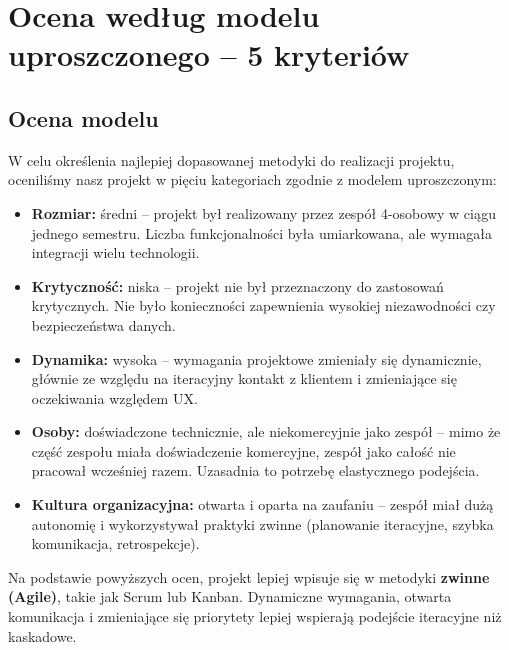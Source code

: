 \documentclass[12pt,a4paper,colorlinks=true,linkcolor=NavyBlue,citecolor=red,urlcolor=NavyBlue]{book}
\begin{document}

\chapter{Ocena według modelu uproszczonego – 5 kryteriów}

\section{Ocena modelu}

W celu określenia najlepiej dopasowanej metodyki do realizacji projektu, oceniliśmy nasz projekt w pięciu kategoriach zgodnie z modelem uproszczonym:

\begin{itemize}
  \item \textbf{Rozmiar:} średni – projekt był realizowany przez zespół 4-osobowy w ciągu jednego semestru. Liczba funkcjonalności była umiarkowana, ale wymagała integracji wielu technologii.
  
  \item \textbf{Krytyczność:} niska – projekt nie był przeznaczony do zastosowań krytycznych. Nie było konieczności zapewnienia wysokiej niezawodności czy bezpieczeństwa danych.
  
  \item \textbf{Dynamika:} wysoka – wymagania projektowe zmieniały się dynamicznie, głównie ze względu na iteracyjny kontakt z klientem i zmieniające się oczekiwania względem UX.
  
  \item \textbf{Osoby:} doświadczone technicznie, ale niekomercyjnie jako zespół – mimo że część zespołu miała doświadczenie komercyjne, zespół jako całość nie pracował wcześniej razem. Uzasadnia to potrzebę elastycznego podejścia.
  
  \item \textbf{Kultura organizacyjna:} otwarta i oparta na zaufaniu – zespół miał dużą autonomię i wykorzystywał praktyki zwinne (planowanie iteracyjne, szybka komunikacja, retrospekcje).
\end{itemize}

\noindent
Na podstawie powyższych ocen, projekt lepiej wpisuje się w metodyki \textbf{zwinne (Agile)}, takie jak Scrum lub Kanban. Dynamiczne wymagania, otwarta komunikacja i zmieniające się priorytety lepiej wspierają podejście iteracyjne niż kaskadowe.
\end{document}
